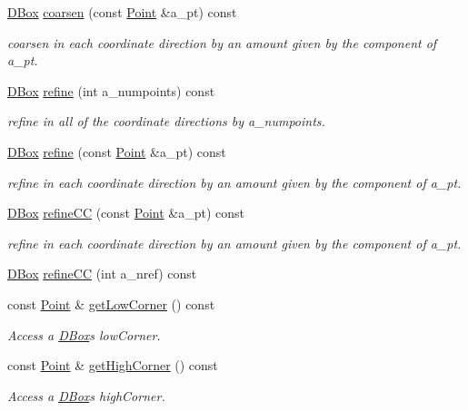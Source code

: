 \begin{DoxyCompactItemize}
\hyperlink{class_d_box}{D\+Box} \hyperlink{class_d_box_aa8b06b12dfb6853ea4a84d03339969dc}{coarsen} (const \hyperlink{class_point}{Point} \&a\+\_\+pt) const
\begin{DoxyCompactList}\small\item\em coarsen in each coordinate direction by an amount given by the component of a\+\_\+pt. \end{DoxyCompactList}\item 
\hyperlink{class_d_box}{D\+Box} \hyperlink{class_d_box_aa7a5dc0dac5dc889b86f6014771c4f56}{refine} (int a\+\_\+numpoints) const
\begin{DoxyCompactList}\small\item\em refine in all of the coordinate directions by a\+\_\+numpoints. \end{DoxyCompactList}\item 
\hyperlink{class_d_box}{D\+Box} \hyperlink{class_d_box_a8452a7fb054283c0ed4488decd86cfda}{refine} (const \hyperlink{class_point}{Point} \&a\+\_\+pt) const
\begin{DoxyCompactList}\small\item\em refine in each coordinate direction by an amount given by the component of a\+\_\+pt. \end{DoxyCompactList}\item 
\hyperlink{class_d_box}{D\+Box} \hyperlink{class_d_box_ad36875d6c989bb3d4c8baaad9a5476ff}{refine\+CC} (const \hyperlink{class_point}{Point} \&a\+\_\+pt) const
\begin{DoxyCompactList}\small\item\em refine in each coordinate direction by an amount given by the component of a\+\_\+pt. \end{DoxyCompactList}\item 
\hyperlink{class_d_box}{D\+Box} \hyperlink{class_d_box_af4826905ec8e333891898b129c8c4951}{refine\+CC} (int a\+\_\+nref) const
\item 
const \hyperlink{class_point}{Point} \& \hyperlink{class_d_box_a15d019841f673b3c170d641706ee07d3}{get\+Low\+Corner} () const
\begin{DoxyCompactList}\small\item\em Access a \hyperlink{class_d_box}{D\+Box}\textquotesingle{}s low\+Corner. \end{DoxyCompactList}\item 
const \hyperlink{class_point}{Point} \& \hyperlink{class_d_box_ab86dcdb4cc7e04d2d2b4208d53d8b446}{get\+High\+Corner} () const
\begin{DoxyCompactList}\small\item\em Access a \hyperlink{class_d_box}{D\+Box}\textquotesingle{}s high\+Corner. \end{DoxyCompactList}\item 

\end{DoxyCompactItemize}
